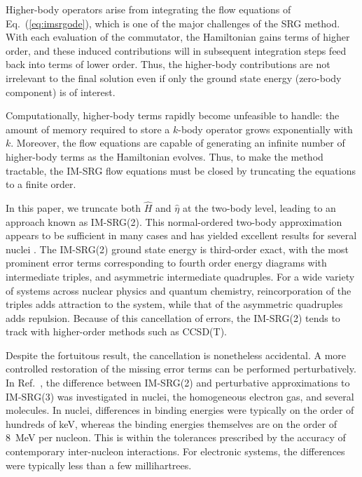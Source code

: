 \documentclass[aip, jcp, 12pt]{revtex4-1}
\begin{document}
Higher-body operators arise from integrating the flow equations of Eq.\ (\ref{eq:imsrgode}), which is one of the major challenges of the SRG method.  With each evaluation of the commutator, the Hamiltonian gains terms of higher order, and these induced contributions will in subsequent integration steps feed back into terms of lower order.  Thus, the higher-body contributions are not irrelevant to the final solution even if only the ground state energy (zero-body component) is of interest.

Computationally, higher-body terms rapidly become unfeasible to handle: the amount of memory required to store a $k$-body operator grows exponentially with $k$.  Moreover, the flow equations are capable of generating an infinite number of higher-body terms as the Hamiltonian evolves.  Thus, to make the method tractable, the IM-SRG flow equations must be closed by truncating the equations to a finite order.

In this paper, we truncate both $\hat{H}$ and $\hat{\eta}$ at the two-body level, leading to an approach known as IM-SRG(2).  This normal-ordered two-body approximation appears to be sufficient in many cases and has yielded excellent results for several nuclei \cite{PhysRevLett.106.222502,PhysRevLett.109.052501,IMSRG}.  The IM-SRG(2) ground state energy is third-order exact, with the most prominent error terms corresponding to fourth order energy diagrams with intermediate triples, and asymmetric intermediate quadruples.  For a wide variety of systems across nuclear physics and quantum chemistry, reincorporation of the triples adds attraction to the system, while that of the asymmetric quadruples adds repulsion.  Because of this cancellation of errors, the IM-SRG(2) tends to track with higher-order methods such as CCSD(T).

Despite the fortuitous result, the cancellation is nonetheless accidental.  A more controlled restoration of the missing error terms can be performed perturbatively.  In Ref.\ \cite{morris2016thesis}, the difference between IM-SRG(2) and perturbative approximations to IM-SRG(3) was investigated in nuclei, the homogeneous electron gas, and several molecules.  In nuclei, differences in binding energies were typically on the order of hundreds of \si{keV}, whereas the binding energies themselves are on the order of \SI{8}{MeV} per nucleon.  This is within the tolerances prescribed by the accuracy of contemporary inter-nucleon interactions.  For electronic systems, the differences were typically less than a few millihartrees.
\end{document}
